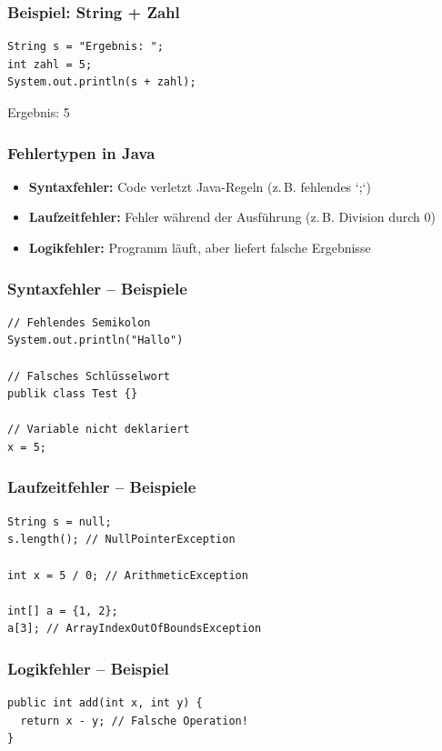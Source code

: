 \documentclass{../../presentation}
\begin{document}
\begin{frame}[fragile]
  \frametitle{Beispiel: String + Zahl}
  \begin{verbatim}
String s = "Ergebnis: ";
int zahl = 5;
System.out.println(s + zahl);
  \end{verbatim}
  \pause
  \begin{ausgabe}
    Ergebnis: 5
  \end{ausgabe}
\end{frame}

\begin{frame}
  \frametitle{Fehlertypen in Java}
  \begin{itemize}
    \item \textbf{Syntaxfehler:} Code verletzt Java-Regeln (z.\,B. fehlendes `;`)
    \item \textbf{Laufzeitfehler:} Fehler während der Ausführung (z.\,B. Division durch 0)
    \item \textbf{Logikfehler:} Programm läuft, aber liefert falsche Ergebnisse
  \end{itemize}
\end{frame}

\begin{frame}[fragile]
  \frametitle{Syntaxfehler – Beispiele}
  \begin{verbatim}
// Fehlendes Semikolon
System.out.println("Hallo")

// Falsches Schlüsselwort
publik class Test {}

// Variable nicht deklariert
x = 5;
  \end{verbatim}
\end{frame}

\begin{frame}[fragile]
  \frametitle{Laufzeitfehler – Beispiele}
  \begin{verbatim}
String s = null;
s.length(); // NullPointerException

int x = 5 / 0; // ArithmeticException

int[] a = {1, 2};
a[3]; // ArrayIndexOutOfBoundsException
  \end{verbatim}
\end{frame}

\begin{frame}[fragile]
  \frametitle{Logikfehler – Beispiel}
  \begin{verbatim}
public int add(int x, int y) {
  return x - y; // Falsche Operation!
}
  \end{verbatim}
\end{frame}
\end{document}
